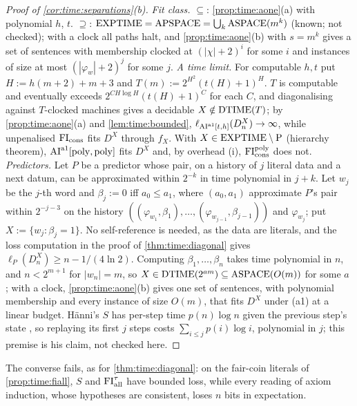 \begin{proof}[Proof of \cref{cor:time:separations}(b)]
\emph{Fit class.} $\subseteq$: \cref{prop:time:aone}(a) with polynomial $h$, $t$. $\supseteq$: $\mathrm{EXPTIME}=\mathrm{APSPACE}=\bigcup_k\mathrm{ASPACE}(m^k)$ \citep{chandra1981alternation} (known; not checked); with a clock all paths halt, and \cref{prop:time:aone}(b) with $s=m^k$ gives a set of sentences with membership clocked at $(|\chi|+2)^i$ for some $i$ and instances of size at most $(|\varphi_w|+2)^j$ for some $j$.
\emph{A time limit.} For computable $h,t$ put $H:=h(m+2)+m+3$ and $T(m):=2^{H^2}(t(H)+1)^H$. $T$ is computable and eventually exceeds $2^{CH\log H}(t(H)+1)^C$ for each $C$, and diagonalising against $T$-clocked machines gives a decidable $X\notin\mathrm{DTIME}(T)$; by \cref{prop:time:aone}(a) and \cref{lem:time:bounded}, $\ell_{\mathrm{AI}^{\mathrm{a1}}[t,h]}(D^X_n)\to\infty$, while unpenalised $\mathrm{FI}_{\mathrm{cons}}$ fits $D^X$ through $f_X$. With $X\in\mathrm{EXPTIME}\setminus\mathrm{P}$ (hierarchy theorem), $\mathrm{AI}^{\mathrm{a1}}[\mathrm{poly},\mathrm{poly}]$ fits $D^X$ and, by overhead (i), $\mathrm{FI}_{\mathrm{cons}}^{\mathrm{poly}}$ does not.
\emph{Predictors.} Let $P$ be a predictor whose pair, on a history of $j$ literal data and a next datum, can be approximated within $2^{-k}$ in time polynomial in $j+k$. Let $w_j$ be the $j$-th word and $\beta_j:=0$ iff $a_0\le a_1$, where $(a_0,a_1)$ approximate $P$'s pair within $2^{-j-3}$ on the history $((\varphi_{w_1},\beta_1),\dots,(\varphi_{w_{j-1}},\beta_{j-1}))$ and $\varphi_{w_j}$; put $X:=\{w_j:\beta_j=1\}$. No self-reference is needed, as the data are literals, and the loss computation in the proof of \cref{thm:time:diagonal} gives $\ell_P(D^X_n)\ge n-1/(4\ln2)$. Computing $\beta_1,\dots,\beta_n$ takes time polynomial in $n$, and $n<2^{m+1}$ for $|w_n|=m$, so $X\in\mathrm{DTIME}(2^{am})\subseteq\mathrm{ASPACE}(O(m))$ for some $a$ \citep{chandra1981alternation}; with a clock, \cref{prop:time:aone}(b) gives one set of sentences, with polynomial membership and every instance of size $O(m)$, that fits $D^X$ under (a1) at a linear budget. H\"anni's $S$ has per-step time $p(n)\log n$ given the previous step's state \citep{hanni2026notes}, so replaying its first $j$ steps costs $\sum_{i\le j}p(i)\log i$, polynomial in $j$; this premise is his claim, not checked here.
\end{proof}

\noindent The converse fails, as for \cref{thm:time:diagonal}: on the fair-coin literals of \cref{prop:time:fiall}, $S$ and $\mathrm{FI}_{\mathrm{all}}^\tau$ have bounded loss, while every reading of axiom induction, whose hypotheses are consistent, loses $n$ bits in expectation.

